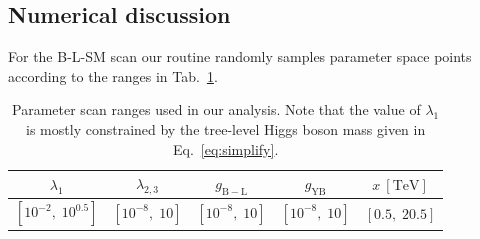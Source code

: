 \documentclass[10pt]{book}
\renewcommand{\(}{\left(}
\renewcommand{\)}{\right)}
\renewcommand{\[}{\left[}
\renewcommand{\]}{\right]}
\begin{document}
\subsection{Numerical discussion}

For the B-L-SM scan our routine randomly samples parameter space points according to the ranges in Tab.~\ref{tab:scan}.
%
\begin{table}[H]
	\begin{center}
		\begin{tabular}{ccccc}
			\toprule                     
			$\lambda_{1}$ & $\lambda_{2,3}$ & $g_{\mathrm{B-L}}$ & $g_{\mathrm{YB}}$ & $x~{\mathrm{[TeV]}}$  
			\\       
						\midrule 
			$\left[10^{-2},\; 10^{0.5}
			\right]$ 			    							& $\left[10^{-8},\; 10
			\right]$ 			    							& $\left[10^{-8},\; 10
			\right]$		& $\left[10^{-8},\; 10
			\right]$	&	$\left[0.5,\; 20.5
			\right]$ 	\\
			\bottomrule
		\end{tabular}  
		\caption{Parameter scan ranges used in our analysis. Note that the value of $\lambda_1$ is mostly constrained by the tree-level Higgs boson mass given in Eq.~\eqref{eq:simplify}. 
		}
		\label{tab:scan}
	\end{center}
\end{table}
\end{document}
